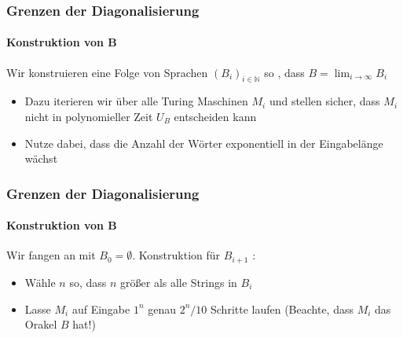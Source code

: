 \begin{frame}
	\frametitle{Grenzen der Diagonalisierung}
	\framesubtitle{Konstruktion von B}
	Wir konstruieren eine Folge von Sprachen $(B_i)_{i \in \mathbb{N}}$ so , dass 
	$B = \lim_{i \to \infty} B_i$	
	\begin{itemize}[<+->]
	\item Dazu iterieren wir \"uber alle Turing Maschinen $M_i$ und stellen
	sicher, dass $M_i$ nicht in polynomieller Zeit $U_B$ entscheiden kann
	\item Nutze dabei, dass die Anzahl der Wörter exponentiell in der Eingabelänge wächst
	\end{itemize}
\end{frame}
\begin{frame}
	\frametitle{Grenzen der Diagonalisierung}
	\framesubtitle{Konstruktion von B}
	Wir fangen an mit $B_0 = \emptyset$. Konstruktion f\"ur $B_{i+1}$ :
	\begin{itemize}[<+->]
		\item Wähle $n$ so, dass $n$ größer als alle Strings in $B_i$
		\item Lasse $M_i$ auf Eingabe $1^n$ genau $2^n / 10$ Schritte laufen
		\newline (Beachte, dass $M_i$ das Orakel $B$ hat!)
	\end{itemize}
\end{frame}
